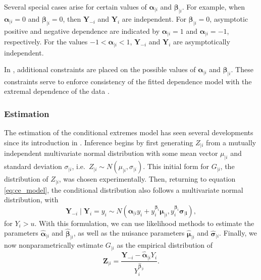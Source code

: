 \documentclass{article}
\numberwithin{equation}{section}
\begin{document}
Several special cases arise for certain values of $\bm{\alpha}_{\mid i}$ and $\bm{\beta}_{\mid i}$.
For example, when $\bm{\alpha}_{\mid i} = 0$ and $\bm{\beta}_{\mid i} = 0$, then $\bm{Y}_{-i}$ and $\bm{Y}_i$ are independent.
For $\bm{\beta}_{\mid i} = 0$, asymptotic positive and negative dependence are indicated by $\bm{\alpha}_{\mid i} = 1$ and $\bm{\alpha}_{\mid i} = -1$, respectively.
For the values $-1 < \bm{\alpha}_{\mid i} < 1$, $\bm{Y}_{-i}$ and $\bm{Y}_i$ are asymptotically independent.


In \citet{Keef2013}, additional constraints are placed on the possible values of $\bm{\alpha}_{\mid i}$ and $\bm{\beta}_{\mid i}$.
These constraints serve to enforce consistency of the fitted dependence model with the extremal dependence of the data \citep{Southworth2024_vignette}.

\subsubsection{Estimation} \label{subsubsec:estimation}

The estimation of the conditional extremes model has seen several developments since its introduction in \citet{Heffernan2004}.
Inference begins by first generating $Z_{\mid i}$ from a mutually independent multivariate normal distribution with some mean vector $\mu_{\mid i}$ and standard deviation $\sigma_{\mid i}$, i.e.\ $Z_{\mid i} \sim N(\mu_{\mid i}, \sigma_{\mid i})$. 
This initial form for $G_{\mid i}$, the distribution of $Z_{\mid i}$, was chosen experimentally. 
Then, returning to equation \eqref{eq:ce_model}, the conditional distribution also follows a multivariate normal distribution, with
\[
  \bm{Y}_{-i} \mid \bm{Y}_i = y_i \sim N\left(\bm{\alpha}_{\mid i} y_i + y_i^{\bm{\beta}_i} \bm{\mu}_{\mid i}, y_i^{\bm{\beta}_i} \bm{\sigma_{\mid i}}\right),
\]
for $Y_i > u$. 
With this formulation, we can use likelihood methods to estimate the parameters $\hat{\bm{\alpha}}_{\mid i}$ and $\hat{\bm{\beta}}_{\mid i}$, as well as the nuisance parameters $\hat{\bm{\mu}}_{\mid i}$ and $\hat{\bm{\sigma}}_{\mid i}$.
Finally, we now nonparametrically estimate $G_{\mid i}$ as the empirical distribution of 
\[
  \bm{Z}_{\mid i} = \frac{\bm{Y}_{-i} - \hat{\bm{\alpha}}_{\mid i}Y_i}{Y_i^{\hat{\bm{\beta}}_{\mid i}}}.
\]
\end{document}
